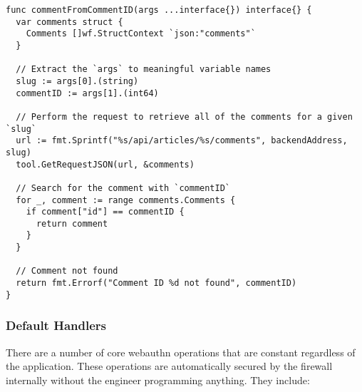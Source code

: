 \begin{lstlisting}
func commentFromCommentID(args ...interface{}) interface{} {
  var comments struct {
    Comments []wf.StructContext `json:"comments"`
  }

  // Extract the `args` to meaningful variable names
  slug := args[0].(string)
  commentID := args[1].(int64)

  // Perform the request to retrieve all of the comments for a given `slug`
  url := fmt.Sprintf("%s/api/articles/%s/comments", backendAddress, slug)
  tool.GetRequestJSON(url, &comments)

  // Search for the comment with `commentID`
  for _, comment := range comments.Comments {
    if comment["id"] == commentID {
      return comment
    }
  }
  
  // Comment not found
  return fmt.Errorf("Comment ID %d not found", commentID)
}
\end{lstlisting}

\iffalse

, and by consequence the firewall, do not have complete knowledge of the items they

\fi

\subsubsection{Default Handlers}\label{Sec:DefaultHandlers}

There are a number of core webauthn operations that are constant regardless of the application. These operations are automatically secured by the firewall internally without the engineer programming anything. They include:

